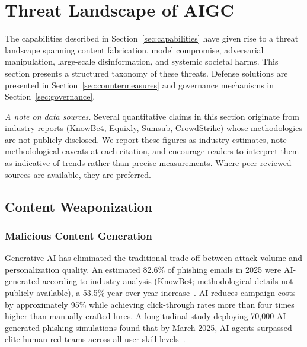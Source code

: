 
\section{Threat Landscape of AIGC}
\label{sec:threats}

The capabilities described in Section~\ref{sec:capabilities} have given rise to a threat landscape spanning content fabrication, model compromise, adversarial manipulation, large-scale disinformation, and systemic societal harms. This section presents a structured taxonomy of these threats. Defense solutions are presented in Section~\ref{sec:countermeasures} and governance mechanisms in Section~\ref{sec:governance}.

\emph{A note on data sources.} Several quantitative claims in this section originate from industry reports (KnowBe4, Equixly, Sumsub, CrowdStrike) whose methodologies are not publicly disclosed. We report these figures as industry estimates, note methodological caveats at each citation, and encourage readers to interpret them as indicative of trends rather than precise measurements. Where peer-reviewed sources are available, they are preferred.


\subsection{Content Weaponization}
\label{sec:threat-weapon}

\subsubsection{Malicious Content Generation}
\label{sec:threat-phishing}

Generative AI has eliminated the traditional trade-off between attack volume and personalization quality. An estimated 82.6\% of phishing emails in 2025 were AI-generated according to industry analysis (KnowBe4; methodological details not publicly available), a 53.5\% year-over-year increase~\cite{knowbe4_2025}. AI reduces campaign costs by approximately 95\% while achieving click-through rates more than four times higher than manually crafted lures. A longitudinal study deploying 70,000 AI-generated phishing simulations found that by March 2025, AI agents surpassed elite human red teams across all user skill levels~\cite{hoxhunt2025}.

